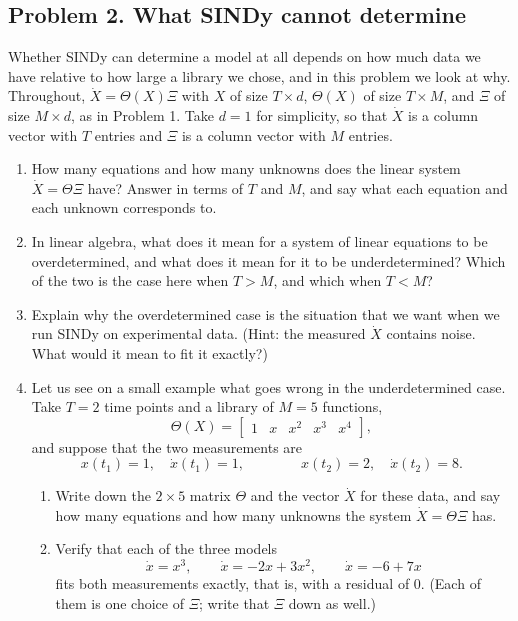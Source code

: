 \documentclass[a4paper,12pt]{article}
\begin{document}
\subsection*{Problem 2. What SINDy cannot determine}

Whether SINDy can determine a model at all depends on how much data we have relative to how large a library we chose, and in this problem we look at why. Throughout, $\dot{X} = \Theta(X)\Xi$ with $X$ of size $T \times d$, $\Theta(X)$ of size $T \times M$, and $\Xi$ of size $M \times d$, as in Problem 1. Take $d=1$ for simplicity, so that $\dot{X}$ is a column vector with $T$ entries and $\Xi$ is a column vector with $M$ entries.

\begin{enumerate}[label=(\alph*)]
\item How many equations and how many unknowns does the linear system $\dot{X}=\Theta\Xi$ have? Answer in terms of $T$ and $M$, and say what each equation and each unknown corresponds to.

\item In linear algebra, what does it mean for a system of linear equations to be overdetermined, and what does it mean for it to be underdetermined? Which of the two is the case here when $T>M$, and which when $T<M$?

\item Explain why the overdetermined case is the situation that we want when we run SINDy on experimental data. (Hint: the measured $\dot{X}$ contains noise. What would it mean to fit it exactly?)

\item Let us see on a small example what goes wrong in the underdetermined case. Take $T=2$ time points and a library of $M=5$ functions,
\[ \Theta(X) = \begin{bmatrix} 1 & x & x^2 & x^3 & x^4 \end{bmatrix} , \]
and suppose that the two measurements are
\[ x\!\left( t_1 \right)=1, \quad \dot{x}\!\left( t_1 \right)=1,
\qquad\qquad
x\!\left( t_2 \right)=2, \quad \dot{x}\!\left( t_2 \right)=8 . \]
\begin{enumerate}[label=(\roman*)]
\item Write down the $2 \times 5$ matrix $\Theta$ and the vector $\dot{X}$ for these data, and say how many equations and how many unknowns the system $\dot{X}=\Theta\Xi$ has.

\item Verify that each of the three models
\[ \dot{x}=x^3, \qquad \dot{x}=-2x+3x^2, \qquad \dot{x}=-6+7x \]
fits both measurements exactly, that is, with a residual of $0$. (Each of them is one choice of $\Xi$; write that $\Xi$ down as well.)


\end{enumerate}
\end{enumerate}
\end{document}
